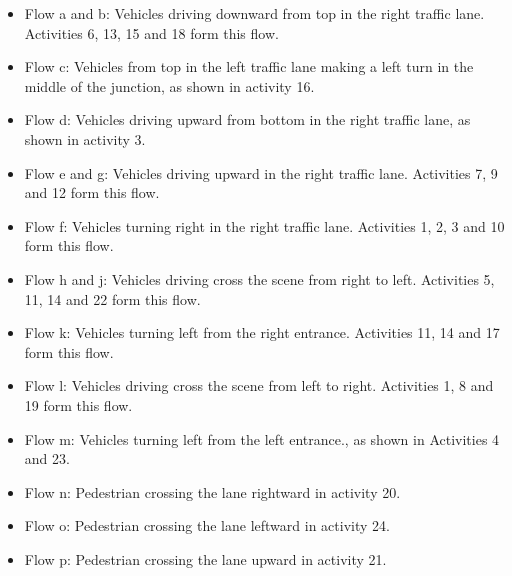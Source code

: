 \begin{itemize}
	\item Flow a and b: Vehicles driving downward from top in the right traffic lane. Activities 6, 13, 15 and 18 form this flow.
	\item Flow c: Vehicles from top in the left traffic lane making a left turn in the middle of the junction, as shown in activity 16.
	\item Flow d: Vehicles driving upward from bottom in the right traffic lane, as shown in activity 3.
	\item Flow e and g: Vehicles driving upward in the right traffic lane. Activities 7, 9 and 12 form this flow.
	\item Flow f: Vehicles turning right in the right traffic lane. Activities 1, 2, 3 and 10 form this flow.
	\item Flow h and j: Vehicles driving cross the scene from right to left. Activities 5, 11, 14 and 22 form this flow.
	\item Flow k: Vehicles turning left from the right entrance. Activities 11, 14 and 17 form this flow.
	\item Flow l: Vehicles driving cross the scene from left to right. Activities 1, 8 and 19 form this flow.
	\item Flow m: Vehicles turning left from the left entrance., as shown in Activities 4 and 23.
	\item Flow n: Pedestrian crossing the lane rightward in activity 20.
	\item Flow o: Pedestrian crossing the lane leftward in activity 24.   
	\item Flow p: Pedestrian crossing the lane upward in activity 21.    
\end{itemize}


